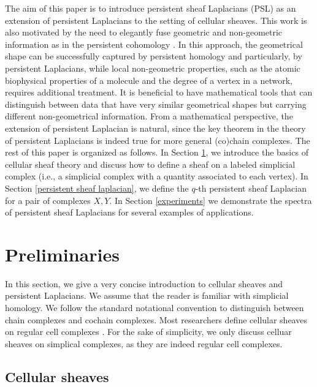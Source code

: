 \documentclass[11pt]{article}
\theoremstyle{definition}
\theoremstyle{definition}
\begin{document}
The aim of this paper is to introduce { persistent sheaf Laplacians} (PSL) as an extension of persistent Laplacians to the setting of cellular sheaves.   
This work is also motivated by the need to elegantly fuse geometric and non-geometric information as in the persistent cohomology  \cite{cang2020persistent}. 
In this approach, the geometrical shape can be successfully captured by persistent homology and particularly, by persistent Laplacians, while local non-geometric properties, such as the atomic biophysical properties of a molecule and the degree of a vertex in a network,  requires additional treatment. 
It is beneficial to have mathematical tools that can distinguish between data that have very similar geometrical shapes but carrying different non-geometrical information.
From a mathematical perspective, the extension of persistent Laplacian is natural, 
since the key theorem in the theory of persistent Laplacians is indeed true for more general (co)chain complexes. 
The rest of this paper is organized as follows. In Section \ref{preliminaries}, we introduce the basics of cellular sheaf theory and discuss how to define a sheaf on a labeled simplicial complex (i.e., a simplicial complex with a quantity associated to each vertex). 
In Section \ref{persistent sheaf laplacian}, we define the $q$-th persistent sheaf Laplacian for a pair of complexes $X,Y$. 
In Section \ref{experiments}  we demonstrate the spectra of persistent sheaf Laplacians for several examples of applications.



\section{Preliminaries}\label{preliminaries}

In this section, we give a very concise introduction to cellular sheaves and persistent Laplacians.
We assume that the reader is familiar with simplicial homology.
{ We follow the standard notational convention to distinguish between chain complexes and cochain complexes.}
Most researchers define cellular sheaves on regular cell complexes \cite{curry2014sheaves,  elementaryappliedtopology, hansen2019toward, topologicalsignalprocessing}. 
For the sake of simplicity, we only discuss celluar sheaves on simplical complexes, as they are indeed regular cell complexes.

\subsection{Cellular sheaves}
\end{document}
